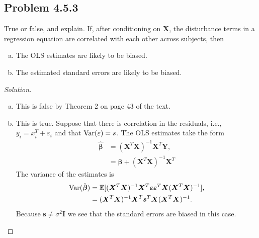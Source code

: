 \documentclass{amsart}\usepackage[]{graphicx}\usepackage[]{color}
\newcommand{\var}{{\rm Var}}
\newcommand{\ep}{\varepsilon}
\newcommand{\bvec}[1]{{\boldsymbol #1}}
\newcommand{\bbeta}{\bvec{\beta}}
\newcommand{\bX}{\bvec{X}}
\newcommand{\bY}{\bvec{Y}}
\begin{document}
		\subsection*{Problem 4.5.3} %
		\label{sub:problem_4_5_3}
			True or false, and explain.
			If, after conditioning on $\bX$, the disturbance terms in a regression equation are correlated with each other across subjects, then
			\begin{enumerate}[(a)]
			    \item The OLS estimates are likely to be biased.
			    \item The estimated standard errors are likely to be biased.
			\end{enumerate}
			\begin{proof}[Solution] \
				\begin{enumerate}[(a)]
					\item This is false by Theorem 2 on page 43 of the text.
					\item This is true.
					Suppose that there is correlation in the residuals, i.e., $y_{i} = x^{T}_{i} + \ep_{i}$ and that $\var(\ep) = s$.
					The OLS estimates take the form
						\begin{align*}
							\hat{\bbeta} &= (\bX^{T}\bX)^{-1}\bX^{T}\bY, \\
							&= \bbeta + (\bX^{T}\bX)^{-1}\bX^{T}
						\end{align*}
					The variance of the estimates is
						\begin{align*}
						 	\var(\hat{\bbeta}) &= \mathbb{E}[(\bX^{T}\bX)^{-1}\bX^{T} \bvec{\ep} \bvec{\ep}^{T} \bX(\bX^{T}\bX)^{-1}], \\
						 	&= (\bX^{T}\bX)^{-1}\bX^{T} \bvec{s}^{T} \bX(\bX^{T}\bX)^{-1}.
						\end{align*}
					Because $\bvec{s} \neq \sigma^{2}\bvec{I}$ we see that the standard errors are biased in this case.
				\end{enumerate}
			\end{proof}

\end{document}
